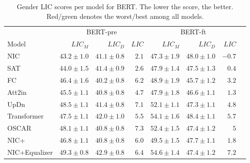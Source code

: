 \begin{table}[H]
\begin{center}
\setlength{\tabcolsep}{6.25pt} %
\renewcommand{\arraystretch}{1.25} %
\begin{tabular}{lrrrrrrr}
\toprule
\multicolumn{1}{c}{} & 
\multicolumn{3}{c}{BERT-pre} &
\multicolumn{3}{c}{BERT-ft}


\\\cmidrule(r){2-4} \cmidrule(r){5-7}
Model & $LIC_M$ & $LIC_D$ & $LIC$ & $LIC_M$ & $LIC_D$ & $LIC$ \\
\hline
NIC \cite{NIC:2015} & $43.2\pm1.0$ & $41.1\pm0.8$ & \textcolor{numbergreen}{$2.1$} & $47.3\pm1.9$ & $48.0\pm1.0$ & \textcolor{numbergreen}{$-0.7$}\\

SAT \cite{SAT:2015} & $44.0\pm1.5$ & $41.4\pm0.9$ & $2.6$ & $47.9\pm1.4$ & $47.5\pm1.3$ & $0.4$\\

FC \cite{Att2inFC:2016} & $46.4\pm1.6$ & $40.2\pm0.8$ & $6.2$ & $48.9\pm1.9$ & $45.7\pm1.2$ & $3.2$ \\

Att2in \cite{Att2inFC:2016} & $45.5\pm1.1$ & $40.8\pm0.8$ & $4.7$ & $47.9\pm1.8$ & $46.6\pm1.1$ & $1.3$ \\

UpDn \cite{UpDn:2017} & $48.5\pm1.1$ & $41.4\pm0.8$ & $7.1$ & $52.1\pm1.1$ & $47.3\pm1.1$ & $4.8$ \\

Transformer \cite{transformer:2017} & $47.5\pm1.1$ & $42.0\pm1.0$ & $5.5$ & $54.1\pm1.6$ & $48.4\pm1.1$ & $5.7$ \\

OSCAR \cite{OSCAR:2020} & $48.1\pm1.1$ & $40.8\pm0.8$ & \textcolor{numberred}{$7.3$} & $52.4\pm1.5$ & $47.4\pm1.2$ & $5$ \\

NIC+ \cite{NICplusNICEqualizer:2018} & $46.8\pm1.1$ & $40.8\pm0.8$ & $6.0$ & $49.5\pm1.5$ & $47.7\pm1.1$ & $1.8$ \\

NIC+Equalizer \cite{NICplusNICEqualizer:2018} & $49.3\pm0.8$ & $42.9\pm0.8$ & $6.4$ & $54.6\pm1.4$ & $47.4\pm1.2$ & \textcolor{numberred}{$7.2$} \\

\bottomrule
\end{tabular}
\caption{Gender LIC scores per model for BERT. The lower the score, the better. Red/green denotes the worst/best among all models.}
\label{table:bertgender}
\end{center}
\end{table}

